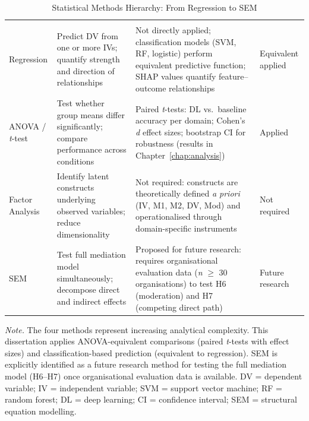 {\tablestripes\tablefontsize
\begin{xltabular}{\textwidth}{@{} >{\raggedright\arraybackslash}p{1.5cm} L L >{\raggedright\arraybackslash}p{1.5cm} @{}}
\caption[Statistical Methods Hierarchy]{Statistical Methods Hierarchy: From Regression to SEM}\label{tab:statistical_methods} \\
\toprule
{} &  &  &  \\
\midrule
\endfirsthead
\toprule
{} &  &  &  \\
\midrule
\endhead
\bottomrule
\endlastfoot
Regression & Predict DV from one or more IVs; quantify strength and direction of relationships & Not directly applied; classification models (SVM, RF, logistic) perform equivalent predictive function; SHAP values quantify feature--outcome relationships & Equivalent applied \\
\addlinespace
ANOVA / \textit{t}-test & Test whether group means differ significantly; compare performance across conditions & Paired \textit{t}-tests: DL vs.\ baseline accuracy per domain; Cohen's \textit{d} effect sizes; bootstrap CI for robustness (results in Chapter~\ref{chap:analysis}) & Applied \\
\addlinespace
Factor Analysis & Identify latent constructs underlying observed variables; reduce dimensionality & Not required: constructs are theoretically defined \textit{a priori} (IV, M1, M2, DV, Mod) and operationalised through domain-specific instruments & Not required \\
\addlinespace
SEM & Test full mediation model simultaneously; decompose direct and indirect effects & Proposed for future research: requires organisational evaluation data (\textit{n} $\geq$ 30 organisations) to test H6 (moderation) and H7 (competing direct path) & Future research \\
\end{xltabular}}
\vspace{0.5em}
\noindent\textit{Note.} The four methods represent increasing analytical complexity. This dissertation applies ANOVA-equivalent comparisons (paired \textit{t}-tests with effect sizes) and classification-based prediction (equivalent to regression). SEM is explicitly identified as a future research method for testing the full mediation model (H6--H7) once organisational evaluation data is available. DV = dependent variable; IV = independent variable; SVM = support vector machine; RF = random forest; DL = deep learning; CI = confidence interval; SEM = structural equation modelling.
\fi %

